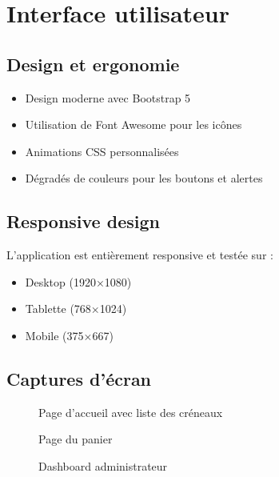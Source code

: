 \documentclass[12pt,a4paper]{article}
\begin{document}
\section{Interface utilisateur}

\subsection{Design et ergonomie}
\begin{itemize}
    \item Design moderne avec Bootstrap 5
    \item Utilisation de Font Awesome pour les icônes
    \item Animations CSS personnalisées
    \item Dégradés de couleurs pour les boutons et alertes
\end{itemize}

\subsection{Responsive design}
L'application est entièrement responsive et testée sur :
\begin{itemize}
    \item Desktop (1920×1080)
    \item Tablette (768×1024)
    \item Mobile (375×667)
\end{itemize}

\subsection{Captures d'écran}
\begin{figure}[h]
\centering
\caption{Page d'accueil avec liste des créneaux}
\end{figure}

\begin{figure}[h]
\centering
\caption{Page du panier}
\end{figure}

\begin{figure}[h]
\centering
\caption{Dashboard administrateur}
\end{figure}
\end{document}
